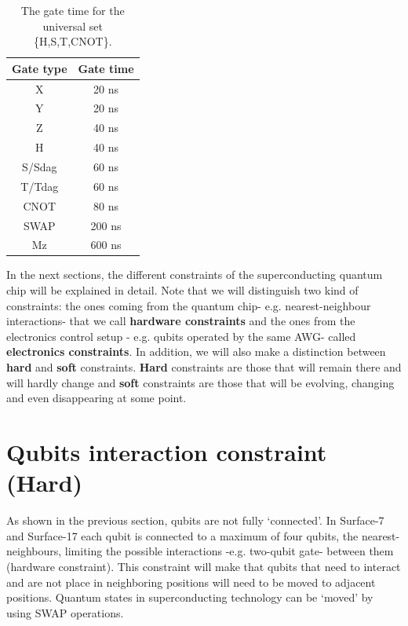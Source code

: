 \documentclass[11pt]{article}
\begin{document}
\begin{table}[bth!]
\centering
\caption{The gate time for the universal set \{H,S,T,CNOT\}.} 
\label{uni_set_gatetime}
\begin{tabular}{c|c}
\hline
Gate type & Gate time \\ \hline
X         & 20 ns     \\ \hline
Y         & 20 ns     \\ \hline
Z         & 40 ns     \\ \hline
H         & 40 ns     \\ \hline
S/Sdag    & 60 ns          \\ \hline
T/Tdag    & 60 ns          \\ \hline
CNOT      & 80 ns     \\ \hline
SWAP      & 200 ns    \\ \hline
Mz         &  600 ns          \\ \hline
\end{tabular}
\end{table}

In the next sections, the different constraints of the superconducting quantum chip will be explained in detail. Note that we will distinguish two kind of constraints: the ones coming from the quantum chip- e.g. nearest-neighbour interactions- that we call \textbf{hardware constraints} and the ones from the electronics control setup - e.g. qubits operated by the same AWG- called \textbf{electronics constraints}. In addition, we will also make a distinction between \textbf{hard} and \textbf{soft} constraints. \textbf{Hard} constraints are those that will remain there and will hardly change and \textbf{soft} constraints are those that will be evolving, changing and even disappearing at some point. 






\section{Qubits interaction constraint (Hard)}
\label{sec:org77a3a48}

As shown in the previous section, qubits are not fully `connected'.
In Surface-7 and Surface-17 each qubit is connected to a maximum of four qubits, the nearest-neighbours, limiting the possible interactions -e.g. two-qubit gate- between them (hardware constraint). This constraint will make that qubits that need to interact and are not place in neighboring positions will need to be moved to adjacent positions. Quantum states in superconducting technology can be `moved' by using SWAP operations.
\end{document}
